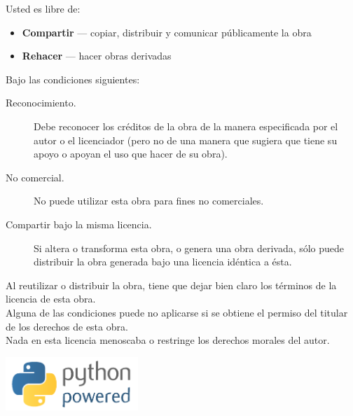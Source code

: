 \noindent
Usted es libre de:
\begin{itemize}
 \item \textbf{Compartir} — copiar, distribuir y comunicar públicamente la obra 
 \item \textbf{Rehacer} — hacer obras derivadas
\end{itemize}
\noindent
Bajo las condiciones siguientes:
\begin{description}
 \item[Reconocimiento.] Debe reconocer los créditos de la obra de la manera especificada por el autor o el licenciador (pero no de una manera que sugiera que tiene su apoyo o apoyan el uso que hacer de su obra).
 \item[No comercial.] No puede utilizar esta obra para fines no comerciales.
 \item[Compartir bajo la misma licencia.] Si altera o transforma esta obra, o genera una obra derivada, sólo puede distribuir la obra generada bajo una licencia idéntica a ésta. 
\end{description}

\noindent
Al reutilizar o distribuir la obra, tiene que dejar bien claro los términos de la licencia de esta obra.\\

\noindent
Alguna de las condiciones puede no aplicarse si se obtiene el permiso del titular de los derechos de esta obra.\\

\noindent
Nada en esta licencia menoscaba o restringe los derechos morales del autor.\\

\vspace*{4cm}
\begin{center}
\includegraphics[width=5cm]{python-powered.png}
\end{center}

\mainmatter

\pagestyle{plain}

